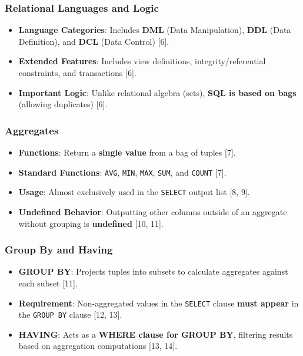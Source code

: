 \documentclass{beamer}
\begin{document}
\begin{frame}
\frametitle{Relational Languages and Logic}
\begin{itemize}
    \item \textbf{Language Categories}: Includes \textbf{DML} (Data Manipulation), \textbf{DDL} (Data Definition), and \textbf{DCL} (Data Control) [6].
    \item \textbf{Extended Features}: Includes view definitions, integrity/referential constraints, and transactions [6].
    \item \textbf{Important Logic}: Unlike relational algebra (sets), \textbf{SQL is based on bags} (allowing duplicates) [6].
\end{itemize}
\end{frame}

\begin{frame}
\frametitle{Aggregates}
\begin{itemize}
    \item \textbf{Functions}: Return a \textbf{single value} from a bag of tuples [7].
    \item \textbf{Standard Functions}: \texttt{AVG}, \texttt{MIN}, \texttt{MAX}, \texttt{SUM}, and \texttt{COUNT} [7].
    \item \textbf{Usage}: Almost exclusively used in the \texttt{SELECT} output list [8, 9].
    \item \textbf{Undefined Behavior}: Outputting other columns outside of an aggregate without grouping is \textbf{undefined} [10, 11].
\end{itemize}
\end{frame}

\begin{frame}
\frametitle{Group By and Having}
\begin{itemize}
    \item \textbf{GROUP BY}: Projects tuples into subsets to calculate aggregates against each subset [11].
    \item \textbf{Requirement}: Non-aggregated values in the \texttt{SELECT} clause \textbf{must appear} in the \texttt{GROUP BY} clause [12, 13].
    \item \textbf{HAVING}: Acts as a \textbf{WHERE clause for GROUP BY}, filtering results based on aggregation computations [13, 14].
\end{itemize}
\end{frame}
\end{document}
